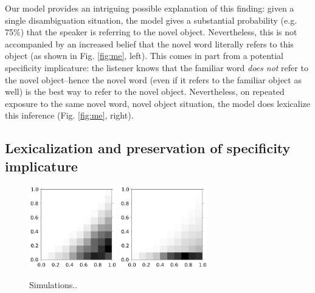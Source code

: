 \documentclass{article} %
\begin{document}
Our model provides an intriguing possible explanation of this finding: given a single disambiguation situation, the model gives a substantial probability (e.g. 75\%) that the speaker is referring to the novel object. Nevertheless, this is not accompanied by an increased belief that the novel word literally refers to this object (as shown in Fig. \ref{fig:me}, left). This comes in part from a potential specificity implicature: the listener knows that the familiar word \emph{does not} refer to the novel object--hence the novel word (even if it refers to the familiar object as well) is the best way to refer to the novel object. Nevertheless, on repeated exposure to the same novel word, novel object situation, the model does lexicalize this inference (Fig. \ref{fig:me}, right).


\subsection{Lexicalization and preservation of specificity implicature}
\label{sec:learning-specificity-implic}

\begin{figure}
\centering
\includegraphics[width=1.5in]{figures/some-all-only-pragmatic.pdf}
\includegraphics[width=1.5in]{figures/some-all-pragmatic+unambiguous.pdf}
\caption{\label{fig:scalar} Simulations..}
\end{figure}

\end{document}
